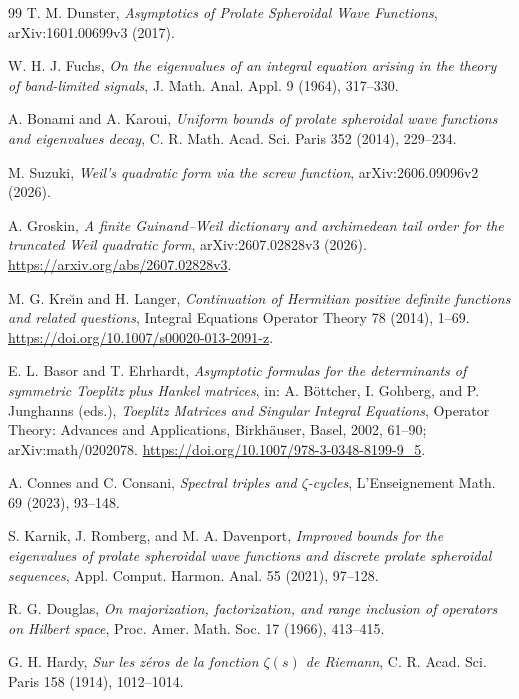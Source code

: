 \documentclass[11pt]{article}
\theoremstyle{remark}
\begin{document}
\begin{thebibliography}{99}
T. M. Dunster,
\emph{Asymptotics of Prolate Spheroidal Wave Functions},
arXiv:1601.00699v3 (2017).

W. H. J. Fuchs,
\emph{On the eigenvalues of an integral equation arising in the theory of band-limited signals},
J. Math. Anal. Appl. 9 (1964), 317--330.

A. Bonami and A. Karoui,
\emph{Uniform bounds of prolate spheroidal wave functions and eigenvalues decay},
C. R. Math. Acad. Sci. Paris 352 (2014), 229--234.

M. Suzuki,
\emph{Weil's quadratic form via the screw function},
arXiv:2606.09096v2 (2026).

A. Groskin,
\emph{A finite Guinand--Weil dictionary and archimedean tail order for the
truncated Weil quadratic form},
arXiv:2607.02828v3 (2026).
\url{https://arxiv.org/abs/2607.02828v3}.

M. G. Kre\u{\i}n and H. Langer,
\emph{Continuation of Hermitian positive definite functions and related
questions},
Integral Equations Operator Theory 78 (2014), 1--69.
\url{https://doi.org/10.1007/s00020-013-2091-z}.

E. L. Basor and T. Ehrhardt,
\emph{Asymptotic formulas for the determinants of symmetric Toeplitz plus
Hankel matrices},
in: A. B\"ottcher, I. Gohberg, and P. Junghanns (eds.),
\emph{Toeplitz Matrices and Singular Integral Equations},
Operator Theory: Advances and Applications, Birkh\"auser, Basel, 2002, 61--90;
arXiv:math/0202078.
\url{https://doi.org/10.1007/978-3-0348-8199-9_5}.

A. Connes and C. Consani,
\emph{Spectral triples and $\zeta$-cycles},
L'Enseignement Math. 69 (2023), 93--148.

S. Karnik, J. Romberg, and M. A. Davenport,
\emph{Improved bounds for the eigenvalues of prolate spheroidal wave functions and discrete prolate spheroidal sequences},
Appl. Comput. Harmon. Anal. 55 (2021), 97--128.

R. G. Douglas,
\emph{On majorization, factorization, and range inclusion of operators on Hilbert space},
Proc. Amer. Math. Soc. 17 (1966), 413--415.

G. H. Hardy, \emph{Sur les z\'eros de la fonction $\zeta(s)$ de Riemann},
C. R. Acad. Sci. Paris 158 (1914), 1012--1014.


\end{thebibliography}
\end{document}
